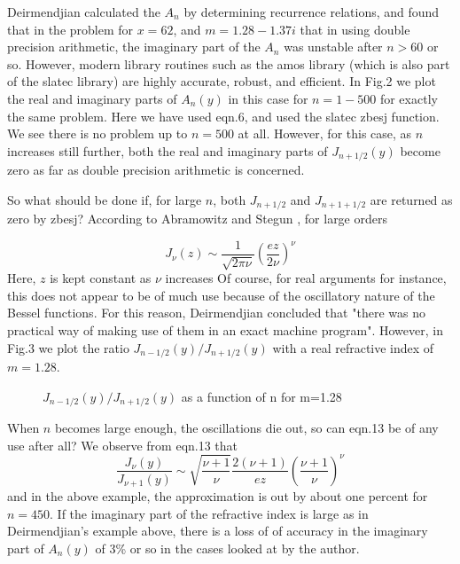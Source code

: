 \documentclass[12pt]{article}
\begin{document}
Deirmendjian calculated the $A_n$ by determining recurrence relations, and found that in the problem for $x=62$, and $m=1.28-1.37i$ that in using double
precision arithmetic, the imaginary part of
the $A_n$ was unstable after $n>60$ or so. However, modern library routines such as the amos library (which is also part of the slatec library) are highly accurate, robust, and efficient. In Fig.2 we plot the real and imaginary parts
of $A_n(y)$ in this case for $n=1 - 500$ for exactly the same problem.  
Here we have used eqn.6, and used the slatec zbesj function. We see there is no problem up to $n=500$ at all.
However, for this case, as $n$ increases still further, both the real and
imaginary parts of $J_{n+1/2}(y)$ become zero as far as double precision
arithmetic is concerned. 

So what should be done if,  for large $n$, both $J_{n+1/2}$ 
and $J_{n+1+1/2}$ 
are returned as zero by zbesj? According to Abramowitz and Stegun
  \cite{AbramowitzStegun:Miebib},  for large orders

\begin{equation}
J_\nu(z) \sim \frac{1}{\sqrt{2 \pi \nu}} 
\left ( \frac{ez}{ 2 \nu} \right )^\nu
\end{equation}
Here, $z$ is kept constant as $\nu$ increases
Of course, for real arguments for instance, this does not appear to be
of much use because of the oscillatory nature of the Bessel functions.
For this reason, Deirmendjian concluded that "there was no practical way 
of making use of them in an exact machine program".
However, in Fig.3 we plot the ratio $J_{n-1/2}(y)/J_{n+1/2}(y)$ 
with a real refractive index of $m=1.28$.
\vspace*{11cm}
\begin{figure}[htb]
\caption{ $J_{n-1/2}(y)/J_{n+1/2}(y)$ as a function of n for m=1.28 }
\end{figure}

When $n$ becomes large enough, the oscillations die out, so can
 eqn.13 be of any use after all? We observe from eqn.13 that
\begin{equation}
\frac{  J_\nu(y)  }{  J_{\nu+1}(y)   } \sim 
   \sqrt{   \frac{\nu+1}{\nu}  }
   \frac{  2(\nu+1)  }{e  z}
 \left ( \frac{\nu+1}{\nu} \right )^\nu 
\end{equation}
and in the above example, the approximation is out by  about one percent
for $n=450$. 
 If the imaginary part of 
the refractive index is large as in Deirmendjian's example above, there
is a loss of of accuracy in the imaginary part of $A_n(y)$ of 3\% or so
in the cases looked at by the author.
\end{document}
